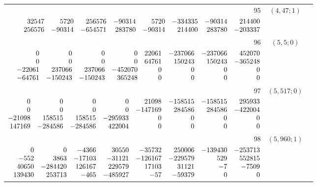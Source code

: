 \documentclass[11pt]{article}
\theoremstyle{remark}
\numberwithin{equation}{section}
\begin{document}
\begin{longtable}{rcl}
95 & $(4,47;1)$ & \begin{tabular}[t]{@{}l@{}}$w_i=\displaystyle \frac{3771971858146137}{147893835802681552000000000000000}$\\[3pt]{\scriptsize$\begin{array}{@{}rrrrrrrr@{}}32547 & 5720 & 256576 & -90314 & 5720 & -334335 & -90314 & 214400\\256576 & -90314 & -654571 & 283780 & -90314 & 214400 & 283780 & -203337\end{array}$}\end{tabular}\\[8pt]
96 & $(5,5;0)$ & \begin{tabular}[t]{@{}l@{}}$w_i=\displaystyle \frac{9517576461589525093}{1203583304045052047360000000000000000000}$\\[3pt]{\scriptsize$\begin{array}{@{}rrrrrrrr@{}}0 & 0 & 0 & 0 & 22061 & -237066 & -237066 & 452070\\0 & 0 & 0 & 0 & 64761 & 150243 & 150243 & -365248\\-22061 & 237066 & 237066 & -452070 & 0 & 0 & 0 & 0\\-64761 & -150243 & -150243 & 365248 & 0 & 0 & 0 & 0\end{array}$}\end{tabular}\\[8pt]
97 & $(5,517;0)$ & \begin{tabular}[t]{@{}l@{}}$w_i=\displaystyle \frac{10438665066265197}{24540654135258729920000000000000000}$\\[3pt]{\scriptsize$\begin{array}{@{}rrrrrrrr@{}}0 & 0 & 0 & 0 & 21098 & -158515 & -158515 & 295933\\0 & 0 & 0 & 0 & -147169 & 284586 & 284586 & -422004\\-21098 & 158515 & 158515 & -295933 & 0 & 0 & 0 & 0\\147169 & -284586 & -284586 & 422004 & 0 & 0 & 0 & 0\end{array}$}\end{tabular}\\[8pt]
98 & $(5,960;1)$ & \begin{tabular}[t]{@{}l@{}}$w_i=\displaystyle \frac{107394004274549959}{30010951631819714950000000000000000}$\\[3pt]{\scriptsize$\begin{array}{@{}rrrrrrrr@{}}0 & 0 & -4366 & 30550 & -35732 & 250006 & -139430 & -253713\\-552 & 3863 & -17103 & -31121 & -126167 & -229579 & 529 & 552815\\40650 & -284420 & 126167 & 229579 & 17103 & 31121 & -7 & -7509\\139430 & 253713 & -465 & -485927 & -57 & -59379 & 0 & 0\end{array}$}\end{tabular}\\[8pt]

\end{longtable}
\end{document}
